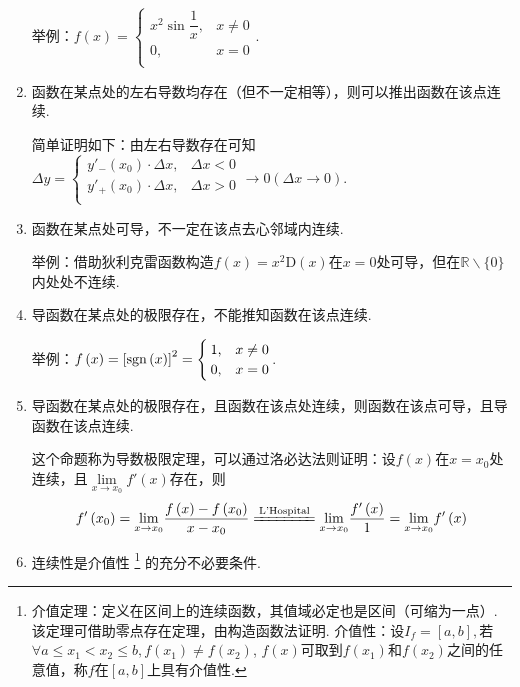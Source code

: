 \begin{enumerate}[label={(\arabic*)}]
      举例：$f\left( x \right) =
      \begin{cases}
        x^2 \sin \dfrac{1}{x}, & x \ne 0\\
        0, & x=0 \\
      \end{cases}$.

      \item 函数在某点处的左右导数均存在（但不一定相等），则可以推出函数在该点连续.

      简单证明如下：由左右导数存在可知$\Delta y=\begin{cases}
        y'_-\left( x_0 \right) \cdot \Delta x,&   \Delta x<0\\
        y'_+\left( x_0 \right) \cdot \Delta x,&   \Delta x>0\\
      \end{cases}\rightarrow 0\left( \Delta x\rightarrow 0 \right)$.

      \item 函数在某点处可导，不一定在该点去心邻域内连续.

      举例：借助狄利克雷函数构造$f\left( x \right) =x^2\text{D}\left( x \right)$在$x=0$处可导，但在$\mathbb{R}\backslash\{0\}$内处处不连续.

      \item 导函数在某点处的极限存在，不能推知函数在该点连续.

      举例：$f\left( x \right) =\left[ \operatorname{\operatorname{sgn}} \left( x \right) \right] ^2=\begin{cases}  \text{1,}&    x\ne 0\\  0, &    x=0\\\end{cases}$.

      \item 导函数在某点处的极限存在，且函数在该点处连续，则函数在该点可导，且导函数在该点连续.

      这个命题称为导数极限定理，可以通过洛必达法则证明：设$f(x)$在$x = x_0$处连续，且$\lim\limits_{x \to x_0} f'(x)$存在，则
      \[ f'\left( x_0 \right) =\underset{x\rightarrow x_0}{\lim}\frac{f\left( x \right) -f\left( x_0 \right)}{x-x_0}\xlongequal{\text{L'Hospital}}\underset{x\rightarrow x_0}{\lim}\frac{f'\left( x \right)}{1}=\underset{x\rightarrow x_0}{\lim}f'\left( x \right) \]

      \item 连续性是介值性
      \footnote{介值定理：定义在区间上的连续函数，其值域必定也是区间（可缩为一点）. 该定理可借助零点存在定理，由构造函数法证明. 介值性：设$I_f=\left[ a,b \right], $若$\forall a\le x_1<x_2\le b,f\left( x_1 \right) \ne f\left( x_2 \right)$, $f\left( x \right) $可取到$f\left( x_1 \right) \text{和}f\left( x_2 \right) $之间的任意值，称$f$在$[a,b]$上具有介值性.}
      的充分不必要条件.


\end{enumerate}
